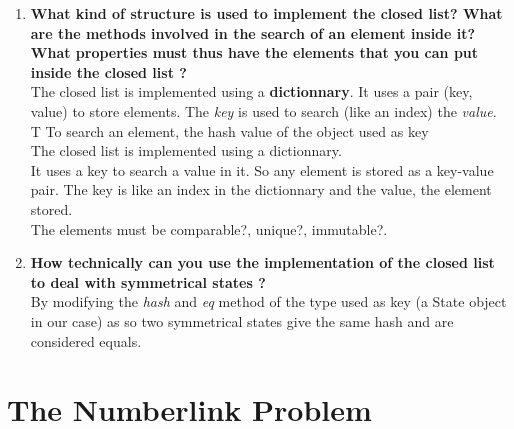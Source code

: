 \documentclass[10pt,a4paper]{article}
\begin{document}
\begin{enumerate}
	\item \textbf{What kind of structure is used to implement the closed list? What are the methods involved in the search of an element inside it? What properties must thus have the elements that you can put inside the closed list ?} \\
	
	The closed list is implemented using a \textbf{dictionnary}. It uses a pair (key, value) to store elements. The \textit{key} is used to search (like an index) the \textit{value}. \\
	T
	To search an element, the hash value of the object used as key \\
	
	The closed list is implemented using a dictionnary.\\
	It uses a key to search a value in it. So any element is stored as a key-value pair. The key is like an index in the dictionnary and the value, the element stored.\\
	
	The elements must be comparable?, unique?, immutable?.
	
	\item \textbf{How technically can you use the implementation of the closed list to deal with symmetrical states ? }\\
	
	By modifying the \textit{hash} and \textit{eq} method of the type used as key (a State object in our case) as so two symmetrical states give the same hash and are considered equals.
		
\end{enumerate}

\section{The Numberlink Problem}
\end{document}
